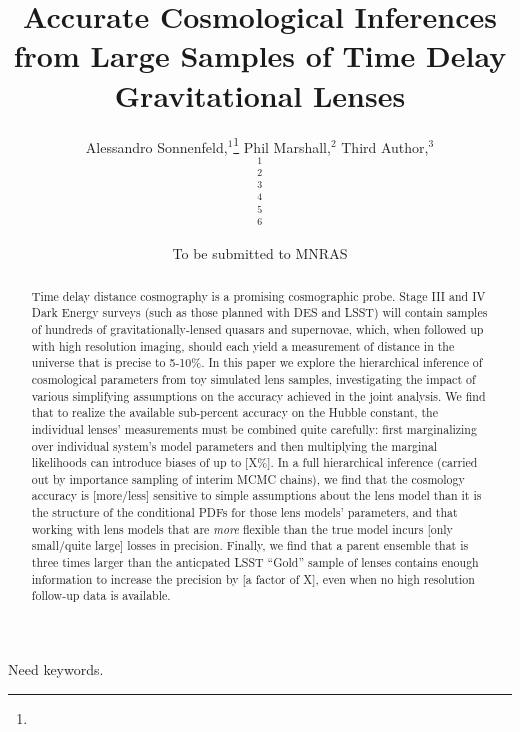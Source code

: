 \documentclass[useAMS,usenatbib]{mn2e}
\title[Cosmology with Large Samples of Lenses]
{Accurate Cosmological Inferences from Large Samples of Time Delay Gravitational Lenses}
\author[All of us]{%
  Alessandro Sonnenfeld,$^{1}$\thanks{\email}
  Phil Marshall,$^{2}$
  Third Author,$^{3}$
\newauthor{%
  Fourth Author,$^{4}$
  Fifth Author,$^{5}$
  Sixth Author.$^{6}$}
  \medskip\\
  $^1$\ucsb\\
  $^2$\kipac\\
  $^3$\thirdplace\\
  $^4$\fourthplace\\
  $^5$\fifthplace\\
  $^6$\sixthplace\\
}
\begin{document}
\date{To be submitted to MNRAS}

\pagerange{\pageref{firstpage}--\pageref{lastpage}}

\maketitle

\label{firstpage}


\begin{abstract}

Time delay distance cosmography is a promising cosmographic probe. Stage III and
IV Dark Energy surveys (such as those planned with DES and LSST) will contain
samples of hundreds of gravitationally-lensed quasars and supernovae, which,
when followed up with high resolution imaging, should each yield a measurement
of distance in the universe that is precise to 5-10\%. In this paper we explore
the hierarchical inference of cosmological parameters from toy simulated lens
samples, investigating the impact of various simplifying assumptions on the
accuracy achieved in the joint analysis. We find that to realize the available
sub-percent accuracy on the Hubble constant, the individual lenses' measurements
must be combined quite carefully: first marginalizing over individual system's
model parameters and then multiplying the marginal likelihoods can introduce
biases of up to [X\%]. In a full hierarchical inference (carried out by
importance sampling of interim MCMC chains), we find that the cosmology accuracy
is [more/less] sensitive to simple assumptions about the lens model than it is
the structure of the conditional PDFs for those lens models' parameters, and
that working with lens models that are {\it more}  flexible than the true model
incurs [only small/quite large] losses in precision. Finally, we find that a
parent ensemble that is three times larger than the anticpated LSST ``Gold''
sample of lenses contains enough information to increase the precision by [a
factor of X], even when no high resolution follow-up data is available.

\end{abstract}

\begin{keywords}
  Need keywords.
\end{keywords}

\end{document}
